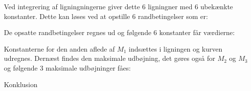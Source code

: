 Ved integrering af ligningningerne giver dette 6 ligningner med 6 ubekænkte konstanter. Dette kan løses ved at opstille 6 randbetingelser som er: 


De opsatte randbetingelser regnes ud og følgende 6 konstanter får værdierne: 


Konstanterne for den anden aflede af $M_1$ indsættes i ligningen og kurven udregnes. Dernæst findes den maksimale udbøjning, det gøres også for $M_2$ og $M_3$ og følgende 3 maksimale udbøjninger fåes: 


Konklusion